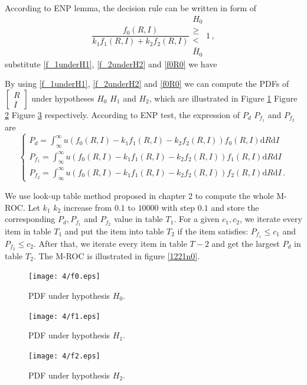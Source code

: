 According to ENP lemma, the decision rule can be written in form of 
\begin{equation}
  \frac{f_0(R,I)}{k_1f_1(R,I)+k_2f_2(R,I)} \substack{H_0 \\ \geq \\ < \\ \bar{H}_0}1\,,
\end{equation}
substitute \eqref{f_1underH1}, \eqref{f_2underH2} and \eqref{f0R0} we have 

By using \eqref{f_1underH1}, \eqref{f_2underH2} and \eqref{f0R0} we can compute the PDFs of  $\begin{bmatrix}
  R \\
  I
\end{bmatrix}$ under hypotheses $H_0$ $H_1$ and $H_2$, which are illustrated in Figure \ref{pic:1218n0} Figure \ref{pic:1218n1} Figure \ref{pic:1218n2} respectively. According to ENP test, the expression of $P_d$ $P_{f_1}$ and $P_{f_2}$ are
\begin{equation}
  \begin{cases}
	P_d = \int_{\infty}^\infty u(f_0(R,I) - k_1f_1(R,I) - k_2f_2(R,I))f_0(R,I)\mathrm{d}R\mathrm{d}I\\ 
	P_{f_1} = \int_{\infty}^\infty u(f_0(R,I) - k_1f_1(R,I) - k_2f_2(R,I))f_1(R,I)\mathrm{d}R\mathrm{d}I\\ 
	P_{f_2} = \int_{\infty}^\infty u(f_0(R,I) - k_1f_1(R,I) - k_2f_2(R,I))f_2(R,I)\mathrm{d}R\mathrm{d}I\,. 
  \end{cases}
  \label{asdffghj}
\end{equation}

We use look-up table method proposed in chapter 2 to compute the whole M-ROC.  Let $k_1$ $k_2$ increase from $0.1$ to $10000$ with step $0.1$ and store the corresponding $P_d, P_{f_1}$ and $P_{f_2}$ value in table $T_1$. For a given $c_1, c_2$, we iterate every item in table $T_1$ and put the item into table $T_2$ if the item satisfies: $P_{f_1} \leq c_1$ and $P_{f_2}\leq c_2$. After that, we iterate every item in table $T-2$ and get the largest $P_d$ in table $T_2$. The M-ROC is illustrated in figure \ref{1221n0}.  

\begin{figure}[!t]
  \centering 
  \texttt{[image: 4/f0.eps]}
  \caption{PDF under hypothesis $H_0$.}
  \label{pic:1218n0}
\end{figure}
\begin{figure}[!t]
  \centering 
  \texttt{[image: 4/f1.eps]}
  \caption{PDF under hypothesis $H_1$.}
  \label{pic:1218n1}
\end{figure}
\begin{figure}[!t]
  \centering 
  \texttt{[image: 4/f2.eps]}
  \caption{PDF under hypothesis $H_2$.}
  \label{pic:1218n2}
\end{figure}

